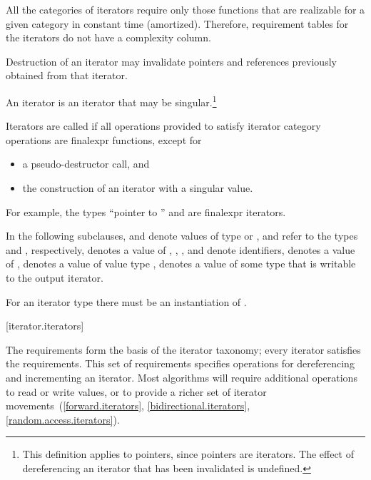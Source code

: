 \pnum
All the categories of iterators require only those functions that are realizable for a given category in
constant time (amortized).
Therefore, requirement tables for the iterators do not have a complexity column.

\pnum
Destruction of an iterator may invalidate pointers and references
previously obtained from that iterator.

\pnum
An
iterator is an iterator that may be singular.\footnote{This definition applies to pointers, since pointers are iterators.
The effect of dereferencing an iterator that has been invalidated
is undefined.
}

\pnum
{}%
Iterators are called 
if all operations provided to satisfy iterator category operations
are finalexpr functions, except for
\begin{itemize}
\item a pseudo-destructor call, and
\item the construction of an iterator with a singular value.
\end{itemize}
\begin{note}
For example, the types ``pointer to '' and
 are finalexpr iterators.
\end{note}

\pnum
In the following subclauses,
and
denote values of type
 or ,
 and  refer to the
types  and
, respectively,
denotes a value of
,
,
,
and
denote identifiers,
denotes a value of
,
denotes a value of value type
,
denotes a value of some type that is writable to the output iterator.
\begin{note} For an iterator type  there must be an instantiation
of . \end{note}

[iterator.iterators]{}

\pnum
The  requirements form the basis of the iterator
taxonomy; every iterator satisfies the  requirements. This
set of requirements specifies operations for dereferencing and incrementing
an iterator. Most algorithms will require additional operations to
read or write values, or
to provide a richer set of iterator movements~(\ref{forward.iterators},
\ref{bidirectional.iterators}, \ref{random.access.iterators}).

